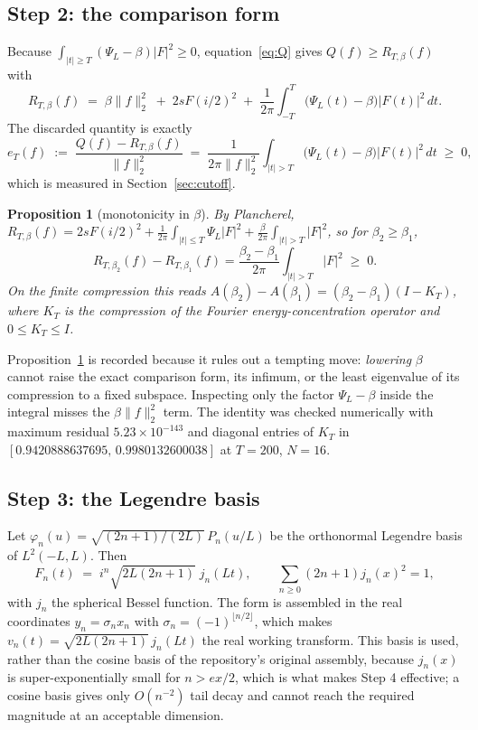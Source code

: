 \documentclass[11pt,a4paper]{article}
\newtheorem{proposition}[theorem]{Proposition}
\theoremstyle{definition}
\theoremstyle{remark}
\newcommand{\PsiL}{\Psi_{L}}
\begin{document}
\subsection{Step 2: the comparison form}

Because $\int_{|t| \ge T} (\PsiL - \beta)|F|^2 \ge 0$, equation~\eqref{eq:Q}
gives $Q(f) \ge R_{T,\beta}(f)$ with
\begin{equation}
\label{eq:R}
   R_{T,\beta}(f) \;=\; \beta \|f\|_2^2 \;+\; 2 s F(i/2)^2
     \;+\; \frac{1}{2\pi}\int_{-T}^{T} \big(\PsiL(t) - \beta\big) |F(t)|^2\, dt .
\end{equation}
The discarded quantity is exactly
\begin{equation}
\label{eq:e}
   e_T(f) \;:=\; \frac{Q(f) - R_{T,\beta}(f)}{\|f\|_2^2}
   \;=\; \frac{1}{2\pi\|f\|_2^2}\int_{|t| > T} \big(\PsiL(t) - \beta\big)|F(t)|^2\, dt
   \;\ge\; 0 ,
\end{equation}
which is measured in Section~\ref{sec:cutoff}.

\begin{proposition}[monotonicity in $\beta$]
\label{prop:beta}
By Plancherel, $R_{T,\beta}(f) = 2sF(i/2)^2 + \frac{1}{2\pi}\int_{|t|\le T}
\PsiL |F|^2 + \frac{\beta}{2\pi}\int_{|t| > T}|F|^2$, so for
$\beta_2 \ge \beta_1$,
\[
   R_{T,\beta_2}(f) - R_{T,\beta_1}(f)
   = \frac{\beta_2-\beta_1}{2\pi}\int_{|t|>T}|F|^2 \;\ge\; 0 .
\]
On the finite compression this reads $A(\beta_2) - A(\beta_1) =
(\beta_2-\beta_1)(I - K_T)$, where $K_T$ is the compression of the Fourier
energy-concentration operator and $0 \le K_T \le I$.
\end{proposition}

Proposition~\ref{prop:beta} is recorded because it rules out a tempting move:
\emph{lowering} $\beta$ cannot raise the exact comparison form, its infimum, or
the least eigenvalue of its compression to a fixed subspace. Inspecting only the
factor $\PsiL - \beta$ inside the integral misses the $\beta\|f\|_2^2$ term. The
identity was checked numerically with maximum residual $5.23\times10^{-143}$ and
diagonal entries of $K_T$ in $[0.9420888637695,\, 0.9980132600038]$ at $T=200$,
$N=16$.

\subsection{Step 3: the Legendre basis}

Let $\varphi_n(u) = \sqrt{(2n+1)/(2L)}\, P_n(u/L)$ be the orthonormal Legendre
basis of $L^2(-L,L)$. Then
\[
   F_n(t) \;=\; i^n \sqrt{2L(2n+1)}\; j_n(Lt) ,
   \qquad \sum_{n \ge 0}(2n+1) j_n(x)^2 = 1 ,
\]
with $j_n$ the spherical Bessel function. The form is assembled in the real
coordinates $y_n = \sigma_n x_n$ with $\sigma_n = (-1)^{\lfloor n/2 \rfloor}$,
which makes $v_n(t) = \sqrt{2L(2n+1)}\,j_n(Lt)$ the real working transform. This
basis is used, rather than the cosine basis of the repository's original
assembly, because $j_n(x)$ is super-exponentially small for $n > ex/2$, which is
what makes Step 4 effective; a cosine basis gives only $O(n^{-2})$ tail decay
and cannot reach the required magnitude at an acceptable dimension.
\end{document}
